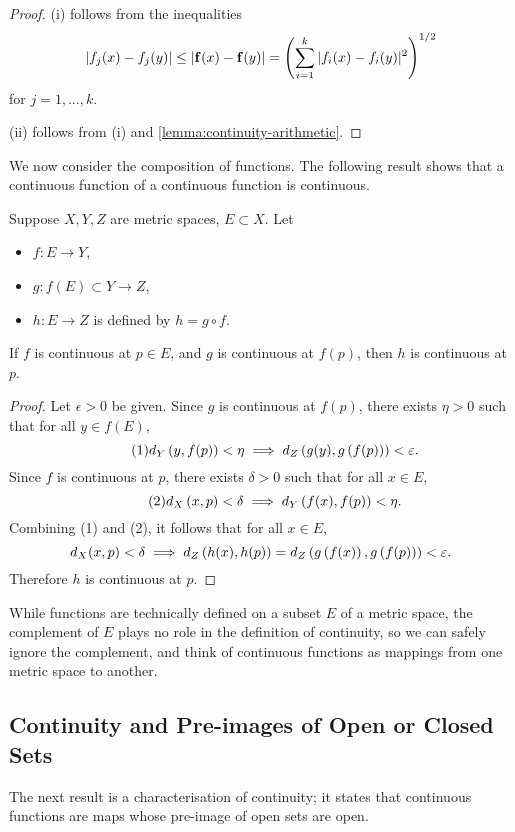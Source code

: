 \begin{proof}
(i) follows from the inequalities
\[|f_j(x)-f_j(y)|\le|\vb{f}(x)-\vb{f}(y)|=\left(\sum_{i=1}^{k}|f_i(x)-f_i(y)|^2\right)^{1/2}\]
for $j=1,\dots,k$.

(ii) follows from (i) and \ref{lemma:continuity-arithmetic}.
\end{proof}

We now consider the composition of functions. The following result shows that a continuous function of a continuous function is continuous.

\begin{proposition}
Suppose $X,Y,Z$ are metric spaces, $E\subset X$. Let 
\begin{itemize}
\item $f\colon E\to Y$,
\item $g\colon f(E)\subset Y\to Z$,
\item $h\colon E\to Z$ is defined by $h=g\circ f$.
\end{itemize}
If $f$ is continuous at $p\in E$, and $g$ is continuous at $f(p)$, then $h$ is continuous at $p$.
\end{proposition}

\begin{proof}
Let $\epsilon>0$ be given. Since $g$ is continuous at $f(p)$, there exists $\eta>0$ such that for all $y\in f(E)$,
\begin{equation*}\tag{1}
d_Y\left(y,f(p)\right)<\eta\implies d_Z\left(g(y),g\left(f(p)\right)\right)<\varepsilon.
\end{equation*}
Since $f$ is continuous at $p$, there exists $\delta>0$ such that for all $x\in E$,
\begin{equation*}\tag{2}
d_X\left(x,p\right)<\delta\implies d_Y\left(f(x),f(p)\right)<\eta.
\end{equation*}
Combining (1) and (2), it follows that for all $x\in E$,
\[d_X(x,p)<\delta\implies d_Z\left(h(x),h(p)\right)=d_Z\left(g\left(f(x)\right),g\left(f(p)\right)\right)<\varepsilon.\]
Therefore $h$ is continuous at $p$. 
\end{proof}

\begin{notation}
While functions are technically defined on a subset $E$ of a metric space, the complement of $E$ plays no role in the definition of continuity, so we can safely ignore the complement, and think of continuous functions as mappings from one metric space to another. 
\end{notation}
\pagebreak

\subsection{Continuity and Pre-images of Open or Closed Sets}
The next result is a characterisation of continuity; it states that continuous functions are maps whose pre-image of open sets are open.

